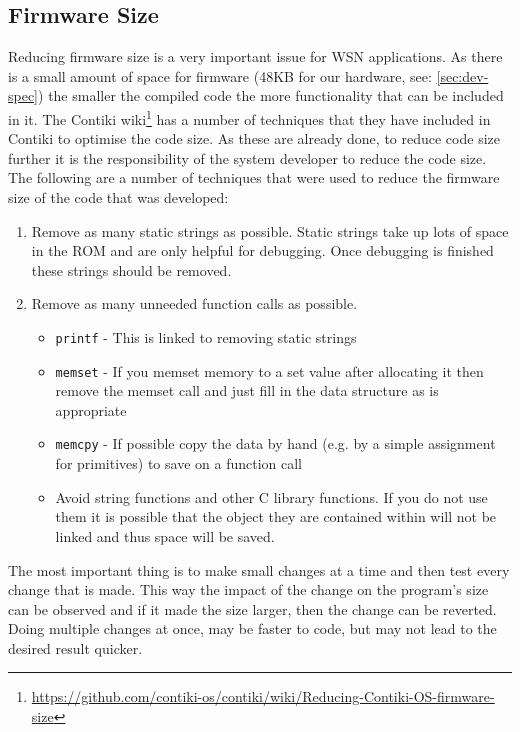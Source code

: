 \subsection{Firmware Size}

Reducing firmware size is a very important issue for WSN applications. As there is a small amount of space for firmware (48KB for our hardware, see: \autoref{sec:dev-spec}) the smaller the compiled code the more functionality that can be included in it. The Contiki wiki\footnote{\url{https://github.com/contiki-os/contiki/wiki/Reducing-Contiki-OS-firmware-size}} has a number of techniques that they have included in Contiki to optimise the code size. As these are already done, to reduce code size further it is the responsibility of the system developer to reduce the code size. The following are a number of techniques that were used to reduce the firmware size of the code that was developed:

\begin{enumerate}
\item Remove as many static strings as possible. Static strings take up lots of space in the ROM and are only helpful for debugging. Once debugging is finished these strings should be removed.
\item Remove as many unneeded function calls as possible.
\begin{itemize}
\item \verb|printf| - This is linked to removing static strings
\item \verb|memset| - If you memset memory to a set value after allocating it then remove the memset call and just fill in the data structure as is appropriate
\item \verb|memcpy| - If possible copy the data by hand (e.g. by a simple assignment for primitives) to save on a function call
\item Avoid string functions and other C library functions. If you do not use them it is possible that the object they are contained within will not be linked and thus space will be saved.
\end{itemize}
\end{enumerate}

The most important thing is to make small changes at a time and then test every change that is made. This way the impact of the change on the program's size can be observed and if it made the size larger, then the change can be reverted. Doing multiple changes at once, may be faster to code, but may not lead to the desired result quicker.

